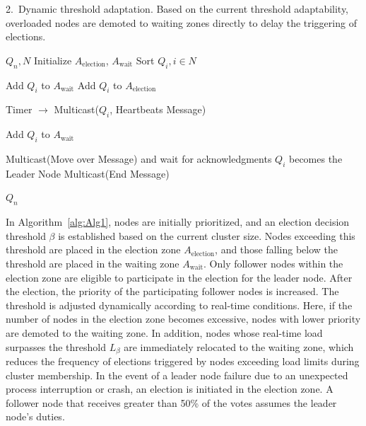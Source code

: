 \documentclass[twoside,twocolumn]{article}
\begin{document}
2.~Dynamic threshold adaptation. Based on the current threshold adaptability, overloaded nodes are demoted to waiting zones directly to delay the triggering of elections.

\begin{algorithm}[h!]
	\small
	\centering
	\caption{Leader--follower election algorithm}
	\label{alg:Alg1}
	\begin{algorithmic}[1]
	\REQUIRE $Q_n, N$
	\STATE Initialize $A_{\text{election}}$, $A_{\text{wait}}$
	\STATE Sort $Q_i, i \in N$
	
			\STATE Add $Q_i$ to $A_{\text{wait}}$
			\STATE Add $Q_i$ to $A_{\text{election}}$
		\ENDIF
	\ENDWHILE
	
	\STATE Timer $\rightarrow$ Multicast($Q_i$, Heartbeats Message)
	
		\STATE Add $Q_i$ to $A_{\text{wait}}$
	\ENDIF
	
		\STATE Multicast(Move over Message) and wait for acknowledgments
			\STATE $Q_i$ becomes the Leader Node
		\ELSE
			\STATE Multicast(End Message)
		\ENDIF
	\ENDIF
	
	\RETURN $Q_n$
	\end{algorithmic}
	\end{algorithm}

In Algorithm~\ref{alg:Alg1}, nodes are initially prioritized, and an election decision threshold $\beta$ is established based on the current cluster size. Nodes exceeding this threshold are placed in the election zone $A_{\text{election}}$, and those falling below the threshold are placed in the waiting zone $A_{\text{wait}}$. Only follower nodes within the election zone are eligible to participate in the election for the leader node. After the election, the priority of the participating follower nodes is increased. The threshold is adjusted dynamically according to real-time conditions. Here, if the number of nodes in the election zone becomes excessive, nodes with lower priority are demoted to the waiting zone. In addition, nodes whose real-time load surpasses the threshold $L_{\text{$\beta$}}$ are immediately relocated to the waiting zone, which reduces the frequency of elections triggered by nodes exceeding load limits during cluster membership. In the event of a leader node failure due to an unexpected process interruption or crash, an election is initiated in the election zone. A follower node that receives greater than 50\% of the votes assumes the leader node's duties.
\end{document}
